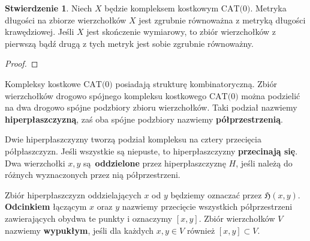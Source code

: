 \documentclass[licencjacka]{pracamgr}
\theoremstyle{definition}
\theoremstyle{definition}
\theoremstyle{definition}
\newtheorem{proposition}{Stwierdzenie}[section]
\theoremstyle{definition}
\theoremstyle{definition}
\theoremstyle{plain}
\theoremstyle{plain}
\begin{document}
\begin{proposition}
	Niech $ X $ będzie kompleksem kostkowym $ \text{CAT(0)}$. Metryka długości na 
	zbiorze wierzchołków $ X $ jest zgrubnie równoważna z metryką długości krawędziowej.
	Jeśli $ X $ jest skończenie wymiarowy, to zbiór wierzchołków z pierwszą bądź drugą z 
	tych metryk jest sobie zgrubnie równoważny.
\end{proposition}
\begin{proof}
%
\end{proof}

Kompleksy kostkowe $ \text{CAT(0)} $ posiadają strukturę kombinatoryczną. Zbiór 
wierzchołków drogowo spójnego kompleksu kostkowego $ \text{CAT(0)} $ można podzielić na dwa 
drogowo spójne podzbiory zbioru wierzchołków. Taki podział nazwiemy 
\textbf{hiperpłaszczyzną}, zaś oba 
spójne podzbiory nazwiemy \textbf{półprzestrzenią}. 

%
%

Dwie hiperpłaszczyzny tworzą podział kompleksu na cztery przecięcia półpłaszczyzn. Jeśli 
wszystkie są niepuste, to hiperpłaszczyzny \textbf{przecinają się}. Dwa wierzchołki 
$ x,y $ są \textbf{oddzielone} przez hiperpłaszczyznę $ H $, jeśli należą do różnych 
wyznaczonych przez nią półprzestrzeni. 

Zbiór hiperpłaszczyzn oddzielających $ x $ od $ y $ będziemy oznaczać przez 
$\mathfrak{H}(x,y)$. \textbf{Odcinkiem} łączącym $ x $ oraz $ y $ nazwiemy przecięcie 
wszystkich półprzestrzeni zawierających obydwa te punkty i oznaczymy $ [x,y]$. Zbiór 
wierzchołków $ V $ nazwiemy \textbf{wypukłym}, jeśli dla każdych $ x,y \in V $ również 
$ [x,y] \subset V $.
\end{document}
